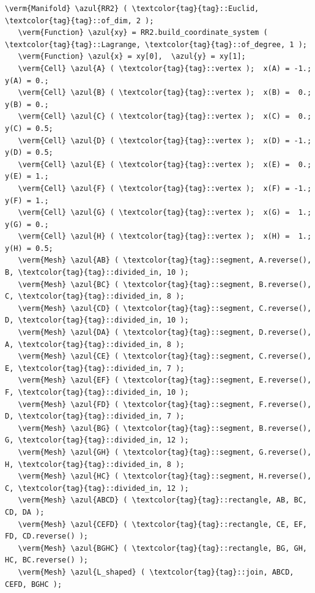\begin{Verbatim}[commandchars=\\\{\},formatcom=\small\tt,frame=single,
   label=parag-\ref{\numb section 1.\numb parag 3}.cpp,rulecolor=\color{coment},
   baselinestretch=0.94,framesep=2mm]
   \verm{Manifold} \azul{RR2} ( \textcolor{tag}{tag}::Euclid, \textcolor{tag}{tag}::of_dim, 2 );
   \verm{Function} \azul{xy} = RR2.build_coordinate_system ( \textcolor{tag}{tag}::Lagrange, \textcolor{tag}{tag}::of_degree, 1 );
   \verm{Function} \azul{x} = xy[0],  \azul{y} = xy[1];
   \verm{Cell} \azul{A} ( \textcolor{tag}{tag}::vertex );  x(A) = -1.;  y(A) = 0.;
   \verm{Cell} \azul{B} ( \textcolor{tag}{tag}::vertex );  x(B) =  0.;  y(B) = 0.;
   \verm{Cell} \azul{C} ( \textcolor{tag}{tag}::vertex );  x(C) =  0.;  y(C) = 0.5;
   \verm{Cell} \azul{D} ( \textcolor{tag}{tag}::vertex );  x(D) = -1.;  y(D) = 0.5;
   \verm{Cell} \azul{E} ( \textcolor{tag}{tag}::vertex );  x(E) =  0.;  y(E) = 1.;
   \verm{Cell} \azul{F} ( \textcolor{tag}{tag}::vertex );  x(F) = -1.;  y(F) = 1.;
   \verm{Cell} \azul{G} ( \textcolor{tag}{tag}::vertex );  x(G) =  1.;  y(G) = 0.;
   \verm{Cell} \azul{H} ( \textcolor{tag}{tag}::vertex );  x(H) =  1.;  y(H) = 0.5;
   \verm{Mesh} \azul{AB} ( \textcolor{tag}{tag}::segment, A.reverse(), B, \textcolor{tag}{tag}::divided_in, 10 );
   \verm{Mesh} \azul{BC} ( \textcolor{tag}{tag}::segment, B.reverse(), C, \textcolor{tag}{tag}::divided_in, 8 );
   \verm{Mesh} \azul{CD} ( \textcolor{tag}{tag}::segment, C.reverse(), D, \textcolor{tag}{tag}::divided_in, 10 );
   \verm{Mesh} \azul{DA} ( \textcolor{tag}{tag}::segment, D.reverse(), A, \textcolor{tag}{tag}::divided_in, 8 );
   \verm{Mesh} \azul{CE} ( \textcolor{tag}{tag}::segment, C.reverse(), E, \textcolor{tag}{tag}::divided_in, 7 );
   \verm{Mesh} \azul{EF} ( \textcolor{tag}{tag}::segment, E.reverse(), F, \textcolor{tag}{tag}::divided_in, 10 );
   \verm{Mesh} \azul{FD} ( \textcolor{tag}{tag}::segment, F.reverse(), D, \textcolor{tag}{tag}::divided_in, 7 );
   \verm{Mesh} \azul{BG} ( \textcolor{tag}{tag}::segment, B.reverse(), G, \textcolor{tag}{tag}::divided_in, 12 );
   \verm{Mesh} \azul{GH} ( \textcolor{tag}{tag}::segment, G.reverse(), H, \textcolor{tag}{tag}::divided_in, 8 );
   \verm{Mesh} \azul{HC} ( \textcolor{tag}{tag}::segment, H.reverse(), C, \textcolor{tag}{tag}::divided_in, 12 );
   \verm{Mesh} \azul{ABCD} ( \textcolor{tag}{tag}::rectangle, AB, BC, CD, DA );
   \verm{Mesh} \azul{CEFD} ( \textcolor{tag}{tag}::rectangle, CE, EF, FD, CD.reverse() );
   \verm{Mesh} \azul{BGHC} ( \textcolor{tag}{tag}::rectangle, BG, GH, HC, BC.reverse() );
   \verm{Mesh} \azul{L_shaped} ( \textcolor{tag}{tag}::join, ABCD, CEFD, BGHC );
\end{Verbatim}


